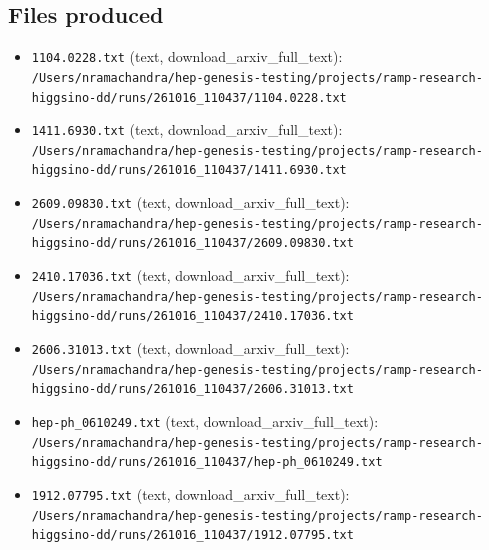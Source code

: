 \documentclass[11pt,a4paper]{article}
\begin{document}
\subsection{Files produced}
\begin{itemize}
  \item \texttt{1104.0228.txt} (text, download\_arxiv\_full\_text): \texttt{/\allowbreak{}Users/\allowbreak{}nramachandra/\allowbreak{}hep-genesis-testing/\allowbreak{}projects/\allowbreak{}ramp-research-higgsino-dd/\allowbreak{}runs/\allowbreak{}261016\_\allowbreak{}110437/\allowbreak{}1104.0228.txt}
  \item \texttt{1411.6930.txt} (text, download\_arxiv\_full\_text): \texttt{/\allowbreak{}Users/\allowbreak{}nramachandra/\allowbreak{}hep-genesis-testing/\allowbreak{}projects/\allowbreak{}ramp-research-higgsino-dd/\allowbreak{}runs/\allowbreak{}261016\_\allowbreak{}110437/\allowbreak{}1411.6930.txt}
  \item \texttt{2609.09830.txt} (text, download\_arxiv\_full\_text): \texttt{/\allowbreak{}Users/\allowbreak{}nramachandra/\allowbreak{}hep-genesis-testing/\allowbreak{}projects/\allowbreak{}ramp-research-higgsino-dd/\allowbreak{}runs/\allowbreak{}261016\_\allowbreak{}110437/\allowbreak{}2609.09830.txt}
  \item \texttt{2410.17036.txt} (text, download\_arxiv\_full\_text): \texttt{/\allowbreak{}Users/\allowbreak{}nramachandra/\allowbreak{}hep-genesis-testing/\allowbreak{}projects/\allowbreak{}ramp-research-higgsino-dd/\allowbreak{}runs/\allowbreak{}261016\_\allowbreak{}110437/\allowbreak{}2410.17036.txt}
  \item \texttt{2606.31013.txt} (text, download\_arxiv\_full\_text): \texttt{/\allowbreak{}Users/\allowbreak{}nramachandra/\allowbreak{}hep-genesis-testing/\allowbreak{}projects/\allowbreak{}ramp-research-higgsino-dd/\allowbreak{}runs/\allowbreak{}261016\_\allowbreak{}110437/\allowbreak{}2606.31013.txt}
  \item \texttt{hep-ph\_\allowbreak{}0610249.txt} (text, download\_arxiv\_full\_text): \texttt{/\allowbreak{}Users/\allowbreak{}nramachandra/\allowbreak{}hep-genesis-testing/\allowbreak{}projects/\allowbreak{}ramp-research-higgsino-dd/\allowbreak{}runs/\allowbreak{}261016\_\allowbreak{}110437/\allowbreak{}hep-ph\_\allowbreak{}0610249.txt}
  \item \texttt{1912.07795.txt} (text, download\_arxiv\_full\_text): \texttt{/\allowbreak{}Users/\allowbreak{}nramachandra/\allowbreak{}hep-genesis-testing/\allowbreak{}projects/\allowbreak{}ramp-research-higgsino-dd/\allowbreak{}runs/\allowbreak{}261016\_\allowbreak{}110437/\allowbreak{}1912.07795.txt}

\end{itemize}
\end{document}
